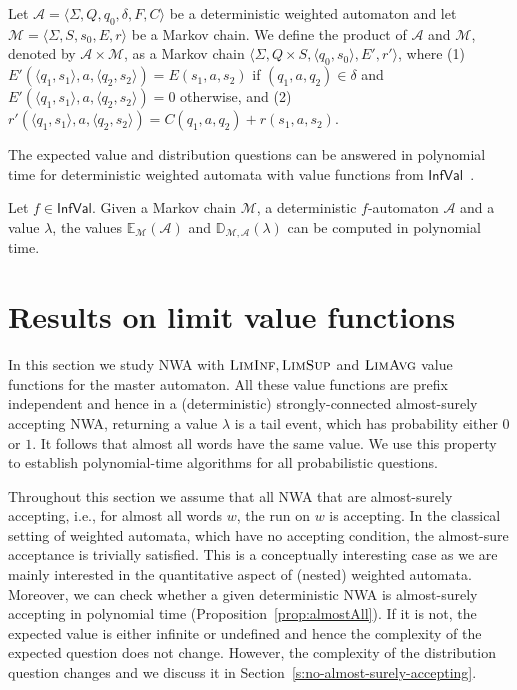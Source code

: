 \documentclass{lmcs}
\newcommand{\Paragraph}[1]{\noindent{\textbf{#1}}}
\newcommand{\cost}{{C}}
\newcommand{\tuple}[1]{\langle#1\rangle}
\newcommand{\flimavg}{\textsc{LimAvg}}
\newcommand{\fliminf}{\textsc{LimInf}}
\newcommand{\flimsup}{\textsc{LimSup}}
\newcommand{\aut}{\mathcal{A}}
\newcommand{\const}{\lambda}
\newcommand{\InfVal}{\mathsf{InfVal}}
\newcommand{\expected}{\mathbb{E}}
\newcommand{\distrib}{\mathbb{D}}
\newcommand{\markov}{\mathcal{M}}
\begin{document}
\smallskip
\Paragraph{The product of an automaton and a Markov chain.}
Let $\aut = \tuple{ \Sigma, Q, q_0, \delta, F, \cost}$ be a deterministic weighted automaton
and let $\markov = \tuple{\Sigma,S,s_0,E, r}$ be a Markov chain.
We define the product of $\aut$ and $\markov$, denoted by $\aut \times \markov$, as a Markov chain
$\tuple{ \Sigma, Q \times S, \tuple{q_0, s_0}, E', r'}$, where
(1)~$E'(\tuple{q_1, s_1}, a, \tuple{q_2, s_2}) = E(s_1, a, s_2)$ if $(q_1, a, q_2) \in \delta$ and
$E'(\tuple{q_1, s_1}, a, \tuple{q_2, s_2}) = 0$ otherwise, and
(2)~$r'(\tuple{q_1, s_1}, a, \tuple{q_2, s_2}) = \cost(q_1, a, q_2) + r(s_1, a, s_2)$.


The expected value and distribution questions can be answered in polynomial time for deterministic weighted automata
with value functions from $\InfVal$~\cite{ChatterjeeDH09LimInf}.

\begin{fact}\label{t:weighted-inf-expected}\label{t:weighted-limavg-expected}
Let $f \in \InfVal$.
Given a  Markov chain $\markov$, a deterministic $f$-automaton $\aut$ and a value $\const$,
the values $\expected_{\markov}(\aut)$ and $\distrib_{\markov, \aut}(\const)$ can be computed
in polynomial time.
\end{fact}


\section{Results on limit value functions}\label{s:limit}
In this section we study NWA with $\fliminf, \flimsup$ and $\flimavg$ value functions for the master automaton.
All these value functions are prefix independent and hence in a (deterministic) strongly-connected almost-surely accepting NWA,
returning a value $\lambda$ is a tail event, which has probability either $0$ or $1$.
It follows that almost all words have the same value.
We use this property to establish polynomial-time algorithms for all probabilistic questions.

Throughout this section we assume that all NWA that are almost-surely accepting, i.e., for almost all words $w$, the run on $w$ is accepting.
In the classical setting of weighted automata, which have no
accepting condition, the almost-sure acceptance is trivially satisfied.
This is a conceptually interesting case as we are mainly interested in the quantitative aspect of (nested) weighted automata.
Moreover, we can check whether a given deterministic NWA is almost-surely accepting in polynomial time (Proposition~\ref{prop:almostAll}).
If it is not, the expected value is either infinite or undefined and hence the complexity of the expected question does not change.
However, the complexity of the distribution question changes and we discuss it in Section~\ref{s:no-almost-surely-accepting}.
\end{document}
